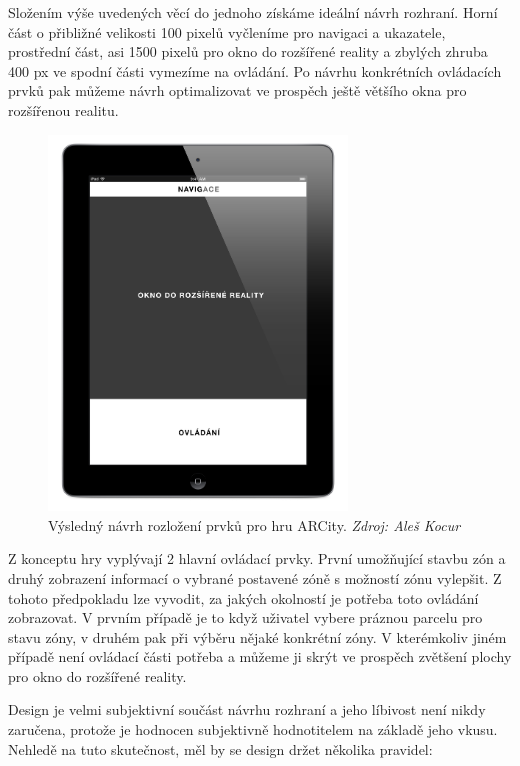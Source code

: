 \documentclass[twoside,12pt]{article}
\begin{document}
Složením výše uvedených věcí do jednoho získáme ideální návrh rozhraní. Horní část o přibližné velikosti 100 pixelů vyčleníme pro navigaci a ukazatele, prostřední část, asi 1500 pixelů pro okno do rozšířené reality a zbylých zhruba 400 px ve spodní části vymezíme na ovládání. Po návrhu konkrétních ovládacích prvků pak můžeme návrh optimalizovat ve prospěch ještě většího okna pro rozšířenou realitu.

\begin{figure}[H]
\centering
    \includegraphics[width=300px, center]{images/ipad_layout_ux.jpg}
\captionsetup{justification=centering}
    \caption[]{Výsledný návrh rozložení prvků pro hru ARCity. \textit{Zdroj: Aleš Kocur}}
    \label{class_diagram}
\end{figure}

Z konceptu hry vyplývají 2 hlavní ovládací prvky. První umožňující stavbu zón a druhý zobrazení informací o vybrané postavené zóně s možností zónu vylepšit. Z tohoto předpokladu lze vyvodit, za jakých okolností je potřeba toto ovládání zobrazovat. V prvním případě je to když uživatel vybere práznou parcelu pro stavu zóny, v druhém pak při výběru nějaké konkrétní zóny. V kterémkoliv jiném případě není ovládací části potřeba a můžeme ji skrýt ve prospěch zvětšení plochy pro okno do rozšířené reality.

\newpage


Design je velmi subjektivní součást návrhu rozhraní a jeho líbivost není nikdy zaručena, protože je hodnocen subjektivně hodnotitelem na základě jeho vkusu. Nehledě na tuto skutečnost, měl by se design držet několika pravidel:
\end{document}
